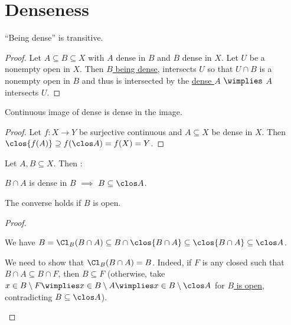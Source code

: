 \section{Denseness}

	\begin{lem}\label{LEM: denseness is transitive}
		``Being dense'' is transitive.
	\end{lem}
	
	\begin{proof}
		Let $A\subseteq B\subseteq X$ with $A$ dense in $B$ and $B$ dense in $X$. Let $U$ be a nonempty open in $X$. Then \uline{$B$ being dense}, intersects $U$ so that $U\cap B$ is a nonempty open in $B$ and thus is intersected by the \uline{dense $A$} $\wimplies$ $A$ intersects $U$.
	\end{proof}
	
	
	\begin{lem}\label{LEM: cont img of dense is dense}
		Continuous image of dense is dense in the image.
	\end{lem}
	
	\begin{proof}
		Let $f\colon X\to Y$ be surjective continuous and $A\subseteq X$ be dense in $X$. Then $\clos{f(A)}\supseteq f(\clos A) = f(X) = Y$.
	\end{proof}
	
	
	
	\begin{lem}\label{LEM: dense on a subset}
		Let $A, B\subseteq X$. Then \tfh:
		\begin{mylist}
			\item $B\cap A$ is dense in $B$ $\implies$ $B\subseteq \clos A$.
			
			\item\label{LEMii: dense on a subset} The converse holds if $B$ is open.
		\end{mylist}
	\end{lem}
	
	\begin{proof}
		\begin{mylist}
			\item We have $B = \Cl_B(B\cap A)\subseteq B\cap \clos{B\cap A}\subseteq\clos{B\cap A}\subseteq\clos A$.
			
			\item We need to show that $\Cl_B(B\cap A) = B$. Indeed, if $F$ is any closed such that $B\cap A\subseteq B\cap F$, then $B\subseteq F$ (otherwise, take $x\in B\setminus F\wimplies x\in B\setminus A\wimplies x\in B\setminus \clos A$ for \uline{$B$ is open}, contradicting $B\subseteq \clos A$).\qedhere
		\end{mylist}
	\end{proof}
	
